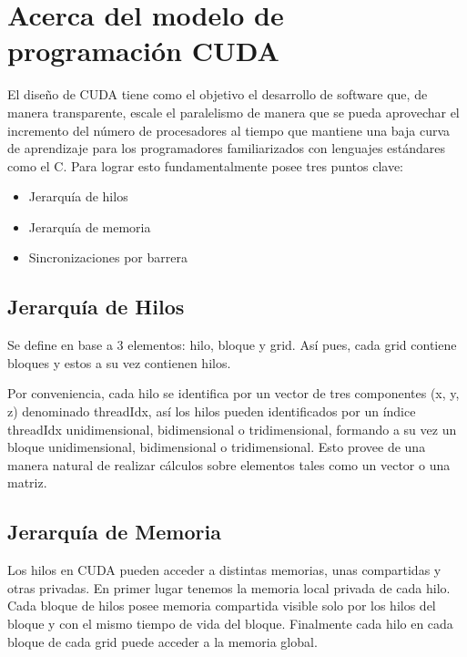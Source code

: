 \documentclass[twocolumn,twoside]{Jornadas}
\begin{document}
\section{Acerca del modelo de programación CUDA}

El diseño de CUDA tiene como el objetivo el desarrollo de software que, de manera transparente, escale el paralelismo de manera que se pueda aprovechar el incremento del número de procesadores al tiempo que mantiene una baja curva de aprendizaje para los programadores familiarizados con lenguajes estándares como el C. Para lograr esto fundamentalmente posee tres puntos clave:

\begin{itemize}
   \item Jerarquía de hilos
   \item Jerarquía de memoria
   \item Sincronizaciones por barrera
\end{itemize}

\subsection{Jerarquía de Hilos}

Se define en base a 3 elementos: hilo, bloque y grid. Así pues, cada grid contiene bloques y estos a su vez contienen hilos.

Por conveniencia, cada hilo se identifica por un vector de tres componentes (x, y, z) denominado threadIdx, así los hilos pueden identificados por un índice threadIdx unidimensional, bidimensional o tridimensional, formando a su vez un bloque unidimensional, bidimensional o tridimensional. Esto provee de una manera natural de realizar cálculos sobre elementos tales como un vector o una matriz.

\subsection{Jerarquía de Memoria}

Los hilos en CUDA pueden acceder a distintas memorias, unas compartidas y otras privadas. En primer lugar tenemos la memoria local privada de cada hilo. Cada bloque de hilos posee memoria compartida visible solo por los hilos del bloque y con el mismo tiempo de vida del bloque. Finalmente cada hilo en cada bloque de cada grid puede acceder a la memoria global.
\end{document}
